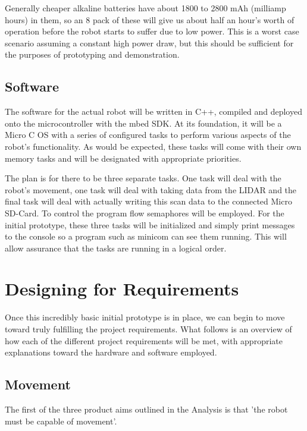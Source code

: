 			Generally cheaper alkaline batteries have about 1800 to 2800 mAh (milliamp hours) in them, so an 8 pack of these will give us about half an hour's worth of operation before the robot starts to suffer due to low power. This is a worst case scenario assuming a constant high power draw, but this should be sufficient for the purposes of prototyping and demonstration. 
			
			\subsection{Software}
			The software for the actual robot will be written in C++, compiled and deployed onto the microcontroller with the mbed SDK. At its foundation, it will be a Micro C OS with a series of configured tasks to perform various aspects of the robot's functionality. As would be expected, these tasks will come with their own memory tasks and will be designated with appropriate priorities. 
			
			The plan is for there to be three separate tasks. One task will deal with the robot's movement, one task will deal with taking data from the LIDAR and the final task will deal with actually writing this scan data to the connected Micro SD-Card. To control the program flow semaphores will be employed. For the initial prototype, these three tasks will be initialized and simply print messages to the console so a program such as minicom can see them running. This will allow assurance that the tasks are running in a logical order.
		
		\section{Designing for Requirements}
		Once this incredibly basic initial prototype is in place, we can begin to move toward truly fulfilling the project requirements. What follows is an overview of how each of the different project requirements will be met, with appropriate explanations toward the hardware and software employed.
		
			\subsection{Movement}
			The first of the three product aims outlined in the Analysis is that 'the robot must be capable of movement'.
